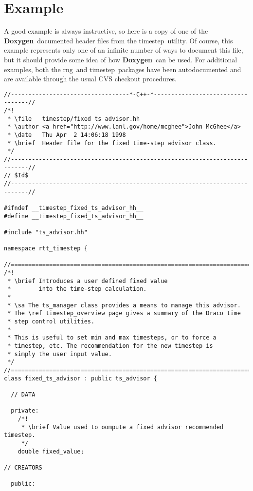 \documentclass[11pt]{nmemo}
\newcommand{\doxy}{{\normalfont\bfseries Doxygen}}
\newcommand{\rng}{{\normalfont\sffamily rng}}
\newcommand{\timestep}{{\normalfont\sffamily timestep}}
\begin{document}

\section{Example}

A good example is always instructive, so here is a copy of
one of the \doxy\ documented header files from the \timestep\ utility.
Of course, this example represents only one of an infinite number of ways
to document this file, but it should provide some idea of how \doxy\
can be used.
For additional examples, both the \rng\ and \timestep\ packages have been
autodocumented and are available through the usual CVS checkout procedures.

\begin{verbatim}
//----------------------------------*-C++-*----------------------------------//
/*! 
 * \file   timestep/fixed_ts_advisor.hh
 * \author <a href="http://www.lanl.gov/home/mcghee">John McGhee</a>
 * \date   Thu Apr  2 14:06:18 1998
 * \brief  Header file for the fixed time-step advisor class.
 */
//---------------------------------------------------------------------------//
// $Id$
//---------------------------------------------------------------------------//

#ifndef __timestep_fixed_ts_advisor_hh__
#define __timestep_fixed_ts_advisor_hh__

#include "ts_advisor.hh"

namespace rtt_timestep {

//===========================================================================//
/*!
 * \brief Introduces a user defined fixed value 
 *        into the time-step calculation.
 *
 * \sa The ts_manager class provides a means to manage this advisor.
 * The \ref timestep_overview page gives a summary of the Draco time 
 * step control utilities. 
 *
 * This is useful to set min and max timesteps, or to force a
 * timestep, etc. The recommendation for the new timestep is
 * simply the user input value. 
 */ 
//===========================================================================//
class fixed_ts_advisor : public ts_advisor {

  // DATA

  private:
    /*!
     * \brief Value used to oompute a fixed advisor recommended timestep.
     */
    double fixed_value; 
   
// CREATORS

  public:


\end{verbatim}
\end{document}
